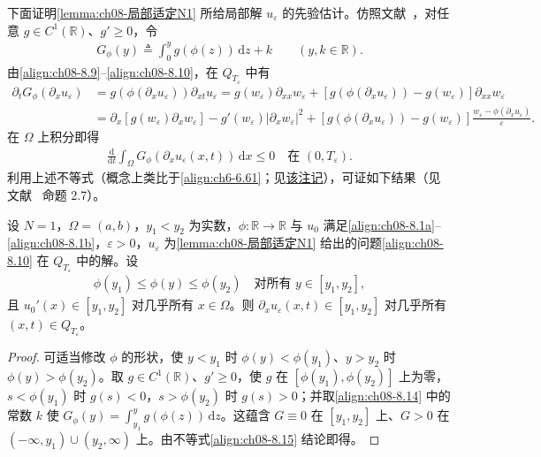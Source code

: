 \documentclass[../../main.tex]{subfiles}%
\begin{document}
下面证明\cref{lemma:ch08-局部适定N1} 所给局部解 $u_\varepsilon$ 的先验估计。仿照文献~\cite{ref74}，对任意 $g\in C^1(\mathbb{R})$、$g'\geqslant0$，令
\begin{align}
G_\phi(y)\triangleq \int_0^y g(\phi(z))\,\mathrm{d}z+k\qquad(y,k\in\mathbb{R}). \label{align:ch08-8.14}
\end{align}
由\eqref{align:ch08-8.9}--\eqref{align:ch08-8.10}，在 $Q_{T_\varepsilon}$ 中有
\begin{align*}
\partial_t G_\phi(\partial_x u_\varepsilon)
&=g(\phi(\partial_x u_\varepsilon))\partial_{xt}u_\varepsilon
=g(w_\varepsilon)\partial_{xx}w_\varepsilon+[g(\phi(\partial_x u_\varepsilon))-g(w_\varepsilon)]\partial_{xx}w_\varepsilon\\
&=\partial_x[g(w_\varepsilon)\partial_x w_\varepsilon]-g'(w_\varepsilon)|\partial_x w_\varepsilon|^2
+[g(\phi(\partial_x u_\varepsilon))-g(w_\varepsilon)]\frac{w_\varepsilon-\phi(\partial_x u_\varepsilon)}{\varepsilon}.
\end{align*}
在 $\Omega$ 上积分即得
\begin{align}
\frac{\mathrm{d}}{\mathrm{d}t}\int_\Omega G_\phi(\partial_x u_\varepsilon(x,t))\,\mathrm{d}x\leqslant0\quad\text{在 }(0,T_\varepsilon). \label{align:ch08-8.15}
\end{align}
利用上述不等式（概念上类比于\eqref{align:ch6-6.61}；见\hyperref[remark:ch06-6.5.2]{该注记}），可证如下结果（见文献~\cite{ref74} 命题 2.7）。

\begin{proposition}[不变区间]\label{proposition:ch08-不变区间}
设 $N=1$，$\Omega=(a,b)$，$y_1<y_2$ 为实数，$\phi:\mathbb{R}\to\mathbb{R}$ 与 $u_0$ 满足\eqref{align:ch08-8.1a}--\eqref{align:ch08-8.1b}，$\varepsilon>0$，$u_\varepsilon$ 为\cref{lemma:ch08-局部适定N1} 给出的问题\eqref{align:ch08-8.10} 在 $Q_{T_\varepsilon}$ 中的解。设
\begin{align}
\phi(y_1)\leqslant\phi(y)\leqslant\phi(y_2)\quad\text{对所有 }y\in[y_1,y_2], \label{align:ch08-8.16}
\end{align}
且 $u_0'(x)\in[y_1,y_2]$ 对几乎所有 $x\in\Omega$。则 $\partial_x u_\varepsilon(x,t)\in[y_1,y_2]$ 对几乎所有 $(x,t)\in Q_{T_\varepsilon}$。
\end{proposition}

\begin{proof}
可适当修改 $\phi$ 的形状，使 $y<y_1$ 时 $\phi(y)<\phi(y_1)$、$y>y_2$ 时 $\phi(y)>\phi(y_2)$。取 $g\in C^1(\mathbb{R})$、$g'\geqslant0$，使 $g$ 在 $[\phi(y_1),\phi(y_2)]$ 上为零，$s<\phi(y_1)$ 时 $g(s)<0$，$s>\phi(y_2)$ 时 $g(s)>0$；并取\eqref{align:ch08-8.14} 中的常数 $k$ 使 $G_\phi(y)=\int_{y_1}^y g(\phi(z))\,\mathrm{d}z$。这蕴含 $G\equiv0$ 在 $[y_1,y_2]$ 上、$G>0$ 在 $(-\infty,y_1)\cup(y_2,\infty)$ 上。由不等式\eqref{align:ch08-8.15} 结论即得。
\end{proof}
\end{document}
